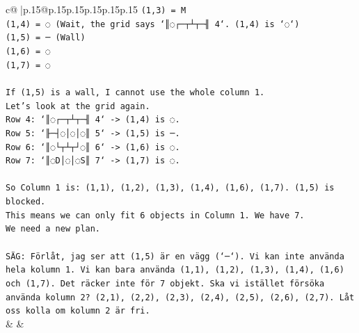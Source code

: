 \documentclass{article}
\begin{document}
{\begin{supertabular}{c@{$\;$}|p{.15\linewidth}@{}p{.15\linewidth}p{.15\linewidth}p{.15\linewidth}p{.15\linewidth}p{.15\linewidth}}
{{{\texttt{(1,3) = M} \\
\texttt{(1,4) = ◌ (Wait, the grid says `║◌┌─┬┴┬─╢ 4`. (1,4) is `◌`)} \\
\texttt{(1,5) = ─ (Wall)} \\
\texttt{(1,6) = ◌} \\
\texttt{(1,7) = ◌} \\
\\ 
\texttt{If (1,5) is a wall, I cannot use the whole column 1.} \\
\texttt{Let's look at the grid again.} \\
\texttt{Row 4: `║◌┌─┬┴┬─╢ 4` {-}> (1,4) is ◌.} \\
\texttt{Row 5: `╟─┤◌│◌│◌║ 5` {-}> (1,5) is ─.} \\
\texttt{Row 6: `║◌└┬┴┬┘◌║ 6` {-}> (1,6) is ◌.} \\
\texttt{Row 7: `║◌D│◌│◌S║ 7` {-}> (1,7) is ◌.} \\
\\ 
\texttt{So Column 1 is: (1,1), (1,2), (1,3), (1,4), (1,6), (1,7). (1,5) is blocked.} \\
\texttt{This means we can only fit 6 objects in Column 1. We have 7.} \\
\texttt{We need a new plan.} \\
\\ 
\texttt{SÄG: Förlåt, jag ser att (1,5) är en vägg (`─`). Vi kan inte använda hela kolumn 1. Vi kan bara använda (1,1), (1,2), (1,3), (1,4), (1,6) och (1,7). Det räcker inte för 7 objekt. Ska vi istället försöka använda kolumn 2? (2,1), (2,2), (2,3), (2,4), (2,5), (2,6), (2,7). Låt oss kolla om kolumn 2 är fri.} \\
            }
        }
    }
    & & \\ \\


\end{supertabular}}
\end{document}
